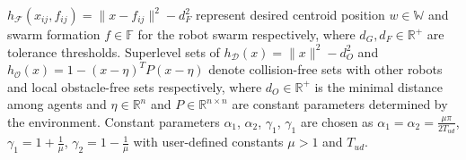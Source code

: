 \documentclass[letterpaper, 10 pt, conference]{ieeeconf}
\begin{document}
$h_{\mathcal{F}}(x_{ij}, f_{ij})\!=\!\|x\!-\!f_{ij} \|^2\!-\!d_F^2$ represent desired centroid position $w\!\in\!\mathbb W$ and swarm formation $f\!\in\!\mathbb F$ for the robot swarm respectively, where $d_G, d_F \in \mathbb{R}^+$ are tolerance thresholds. Superlevel sets of $h_{\mathcal{D}}(x)\!=\!\|x \|^2 - d_O^2$ and $h_{\mathcal{O}}(x)\!=\!1\!-\!(x\!-\!\eta)^T \!P(x\!-\!\eta)$ denote collision-free sets with other robots and local obstacle-free sets respectively, where $d_O\!\in\!\mathbb{R}^+$ is the minimal distance among agents and $\eta\!\in\!\mathbb{R}^n$ and $P\!\in \mathbb{R}^{n\!\times\!n}$ are constant parameters determined by the environment. Constant parameters $\alpha_1$, $\alpha_2$, $\gamma_1$, $\gamma_1$ are chosen as $\alpha_1\!=\!\alpha_2\!=\!\frac{\mu \pi}{2 T_{ud}}$, $\gamma_1\!=\!1\!+\!\frac{1}{\mu}$, $\gamma_2\!=\!1\!-\!\frac{1}{\mu}$ with user-defined constants $\mu>1$ and $T_{ud}$.




\end{document}

